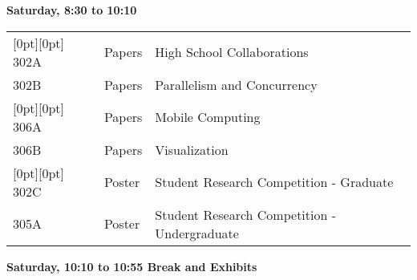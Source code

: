 \noindent
{\sffamily\bfseries Saturday, 8:30 to 10:10}\newline\noindent
\begin{tabular*}{5in}{@{}p{0.5in}@{}p{0.75in}@{}p{3.75in}}

\rowcolor[gray]{0.9}[0pt][0pt] 302A & Papers & High School Collaborations \\

302B & Papers & Parallelism and Concurrency \\

\rowcolor[gray]{0.9}[0pt][0pt] 306A & Papers & Mobile Computing \\

306B & Papers & Visualization \\

\rowcolor[gray]{0.9}[0pt][0pt] 302C & Poster & Student Research Competition - Graduate \\

305A & Poster & Student Research Competition - Undergraduate \\
\end{tabular*}\newline





\noindent
{\sffamily\bfseries Saturday, 10:10 to 10:55 Break and Exhibits}\newline\noindent


